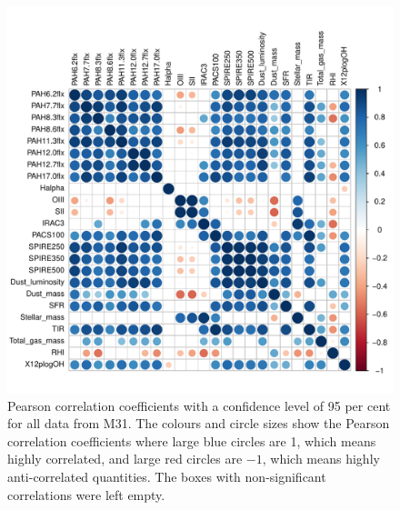       \begin{figure}
        \centering
        \includegraphics[width=\textwidth]{../images0.01/cor_plots/M31_all_derived_ones_core_plot_for_paper.pdf}
        \caption{Pearson correlation coefficients with a confidence level of 95 per cent for all data from M31. The colours and circle sizes show the Pearson correlation coefficients where large blue circles are 1, which means highly correlated, and large red circles are $-1$, which means highly anti-correlated quantities. The boxes with non-significant correlations were left empty.}
        \label{fig: cor_all}
    \end{figure}
 
